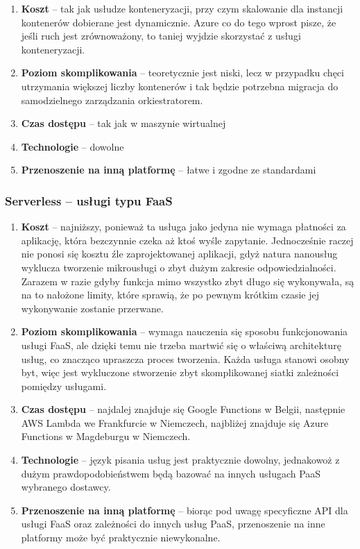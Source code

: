 \documentclass[12pt,a4paper,twoside,titlepage,openright]{book}
\begin{document}
\begin{enumerate}
	\item \textbf{Koszt} -- tak jak usłudze konteneryzacji, przy czym skalowanie dla instancji kontenerów dobierane jest dynamicznie. Azure co do tego wprost pisze, że jeśli ruch jest zrównoważony, to taniej wyjdzie skorzystać z usługi konteneryzacji.
	\item \textbf{Poziom skomplikowania} -- teoretycznie jest niski, lecz w przypadku chęci utrzymania większej liczby kontenerów i tak będzie potrzebna migracja do samodzielnego zarządzania orkiestratorem.
	\item \textbf{Czas dostępu} -- tak jak w maszynie wirtualnej
	\item \textbf{Technologie} -- dowolne
	\item \textbf{Przenoszenie na inną platformę} -- łatwe i zgodne ze standardami
\end{enumerate}


\subsubsection{Serverless -- usługi typu FaaS}

\begin{enumerate}
	\item \textbf{Koszt} -- najniższy, ponieważ ta usługa jako jedyna nie wymaga płatności za aplikację, która bezczynnie czeka aż ktoś wyśle zapytanie. Jednocześnie raczej nie ponosi się kosztu źle zaprojektowanej aplikacji, gdyż natura nanousług wyklucza tworzenie mikrousługi o zbyt dużym zakresie odpowiedzialności. Zarazem w razie gdyby funkcja mimo wszystko zbyt długo się wykonywała, są na to nałożone limity, które sprawią, że po pewnym krótkim czasie jej wykonywanie zostanie przerwane.
	\item \textbf{Poziom skomplikowania} -- wymaga nauczenia się sposobu funkcjonowania usługi FaaS, ale dzięki temu nie trzeba martwić się o właściwą architekturę usług, co znacząco upraszcza proces tworzenia. Każda usługa stanowi osobny byt, więc jest wykluczone stworzenie zbyt skomplikowanej siatki zależności pomiędzy usługami.
	\item \textbf{Czas dostępu} -- najdalej znajduje się Google Functions w Belgii, następnie  AWS Lambda we Frankfurcie w Niemczech, najbliżej znajduje się Azure Functions w Magdeburgu w Niemczech.
	\item \textbf{Technologie} -- język pisania usług jest praktycznie dowolny, jednakowoż z dużym prawdopodobieństwem będą bazować na innych usługach PaaS wybranego dostawcy.
	\item \textbf{Przenoszenie na inną platformę} -- biorąc pod uwagę specyficzne API dla usługi FaaS oraz zależności do innych usług PaaS, przenoszenie na inne platformy może być praktycznie niewykonalne.
\end{enumerate}
\end{document}
